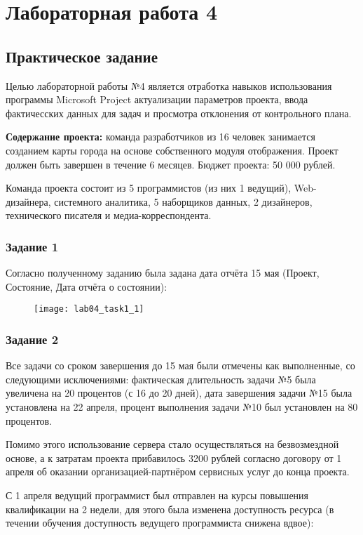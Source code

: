\chapter{Лабораторная работа 4}
\section*{Практическое задание}

Целью лабораторной работы №4 является отработка навыков использования программы Microsoft Project актуализации параметров проекта, ввода фактичесских данных для задач и просмотра отклонения от контрольного плана.

\textbf{Содержание проекта:} команда разработчиков из 16 человек занимается созданием карты города на основе собственного модуля отображения. Проект должен быть завершен в течение 6 месяцев. Бюджет проекта: 50 000 рублей.

Команда проекта состоит из 5 программистов (из них 1 ведущий), Web-дизайнера, системного аналитика, 5 наборщиков данных, 2 дизайнеров, технического писателя и медиа-корреспондента.

\subsection*{Задание 1}

Согласно полученному заданию была задана дата отчёта 15 мая (Проект, Состояние, Дата отчёта о состоянии):
\begin{figure}[h!]
	\texttt{[image: lab04\_task1\_1]}
\end{figure}


\subsection*{Задание 2}

Все задачи со сроком завершения до 15 мая были отмечены как выполненные, со следующими исключениями: фактическая длительность задачи №5 была увеличена на 20 процентов (с 16 до 20 дней), дата завершения задачи №15 была установлена на 22 апреля, процент выполнения задачи №10 был установлен на 80 процентов.

Помимо этого использование сервера стало осуществляться на безвозмездной основе, а к затратам проекта прибавилось 3200 рублей согласно договору от 1 апреля об оказании организацией-партнёром сервисных услуг до конца проекта.

С 1 апреля ведущий программист был отправлен на курсы повышения квалификации на 2 недели, для этого была изменена доступность ресурса (в течении обучения доступность ведущего программиста снижена вдвое):

